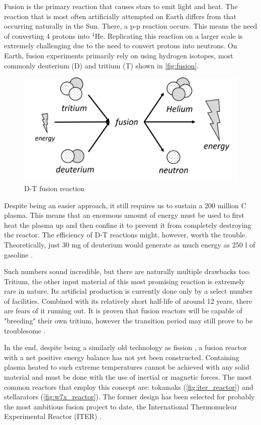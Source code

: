   Fusion is the primary reaction that causes stars to emit light and heat.
  The reaction that is most often artificially attempted on Earth differs
  from that occurring naturally in the Sun. There, a p-p reaction occurs. 
  This means the need of converting 4 protons into ${}^{4}$He.
  Replicating this reaction on a larger scale is extremely challenging 
  due to the need to convert protons into neutrons.
  On Earth, fusion experiments primarily rely on using hydrogen isotopes, 
  most commonly deuterium (D) and tritium (T) shown in \autoref{fig:fusion}.
	\begin{figure}[H]
	  \centering
	  \includegraphics[width=.75\linewidth]{media/fusion.png}
	  \caption{D-T fusion reaction}
	  \label{fig:fusion}
	\end{figure}



  Despite being an easier approach, it still requires us to sustain
  a 200 million \degree C plasma. This means that an enormous amount of energy
  must be used to first heat the plasma up and then confine it to 
  prevent it from completely destroying the reactor. 
  The efficiency of D-T reactions might, however, worth the trouble.
  Theoretically, just 30 mg of deuterium would generate as much energy
  as 250 l of gasoline \cite{nuclear_fusion_status}. 


  Such numbers sound incredible, but there are naturally multiple drawbacks too.
  Tritium, the other input material of this most promising reaction is
  extremely rare in nature. Its artificial production is currently 
  done only by a select number of facilities. 
  Combined with its relatively short half-life of around 12 years, 
  there are fears of it running out. It is proven that fusion reactors
  will be capable of "breeding" their own tritium, however the transition period 
  may still prove to be troublesome \cite{fusion_fuel_running_out}.


  In the end, despite being a similarly old technology as fission
  \cite{fusion_history},
  a fusion reactor with a net positive energy balance
  has not yet been constructed. Containing plasma heated to such extreme
  temperatures cannot be achieved with any solid material and must 
  be done with the use of inertial or magnetic forces. 
  The most common reactors that employ this concept are:
  tokamaks (\autoref{fig:iter_reactor}) 
  and stellarators (\autoref{fig:w7x_reactor}).
  The former design has been selected for probably
  the most ambitious fusion project to date, 
  the International Thermonuclear Experimental Reactor (ITER)
  \cite{nuclear_fusion_status}.

